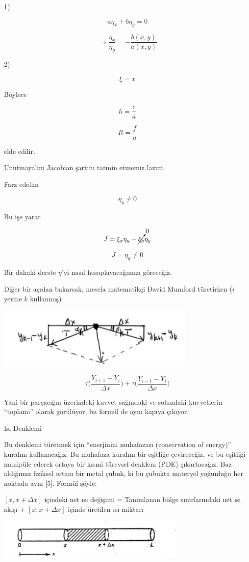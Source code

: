 \documentclass[12pt,fleqn]{article}\usepackage{../../common}
\begin{document}
1)

$$ a \eta_x + b \eta_y = 0 $$

$$ \Rightarrow \frac{\eta_x}{\eta_y} = -\frac{b(x,y)}{a(x,y)}$$

2)

$$ \xi = x $$

Böylece 

$$ h = \frac{c}{a} $$

$$ R = \frac{f}{a} $$

elde edilir. 

Unutmayalım Jacobian şartını tatmin etmemiz lazım. 

Farz edelim 

$$ \eta_y \ne 0 $$

Bu işe yarar 

$$ J = \xi_x\eta_y - \cancelto{0}{\xi_y}\eta_y $$

$$ J = \eta_y \ne 0 $$

Bir dahaki derste $\eta$'yi nasıl hesaplayacağımızı göreceğiz. 

Diğer bir açıdan bakarsak, mesela matematikçi David Mumford türetirken ($i$
yerine $k$ kullanmış)

\includegraphics[height=3cm]{1_15.png}

$$ 
\tau \bigg( \frac{Y_{i+1}- Y_i}{\Delta x} \bigg) +
\tau \bigg( \frac{Y_{i-1}- Y_{i}}{\Delta x} \bigg) 
$$

Yani bir parçacığın üzerindeki kuvvet sağındaki ve solundaki kuvvetlerin
``toplamı'' olarak görülüyor, bu formül de aynı kapıya çıkıyor.

Isı Denklemi

Bu denklemi türetmek için ``enerjinini muhafazası (conservation of
energy)'' kuralını kullanacağız. Bu muhafaza kuralını bir eşitliğe
çevireceğiz, ve bu eşitliği manipüle ederek ortaya bir kısmi türevsel
denklem (PDE) çıkartacağız. Baz aldığımız fiziksel ortam bir metal çubuk,
ki bu çubukta materyel yoğunluğu her noktada aynı [5].  Formül şöyle;

$[x,x+\Delta x]$ içindeki net ısı değişimi = Tanımlanan bölge
sınırlarındaki net ısı akışı + $[x,x+\Delta x]$ içinde üretilen ısı miktarı

\includegraphics[height=2cm]{heat_1.png}
\end{document}
